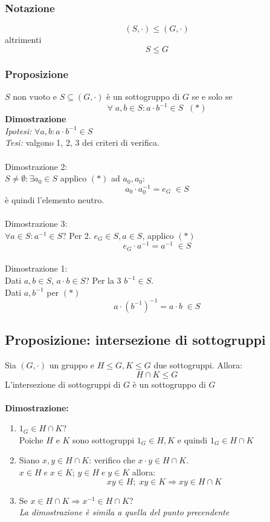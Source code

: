 \subsubsection{Notazione}
\[(S,\cdot)\leq (G,\cdot )\]
altrimenti
\[S\leq G\]

\subsubsection{Proposizione}
\(S\) non vuoto e \(S\subseteq (G,\cdot)\) è un sottogruppo di \(G\) se e solo se
\[\forall\;a,b \in S: a\cdot b^{-1}\in S\;\;(*)\]
\textbf{Dimostrazione}
\\\textit{Ipotesi:} \(\forall a,b: a\cdot b^{-1}\in S\)
\\\textit{Tesi:} valgono 1, 2, 3 dei criteri di verifica.
\\\\
Dimostrazione 2:
\\
\(S\neq\emptyset :\exists a_0\in S\) applico \((*)\) ad \(a_0, a_0\):
\[a_0\cdot a_0^{-1}=e_G\;\in S\]
è quindi l'elemento neutro.
\\\\
Dimostrazione 3:
\\
\(\forall a\in S:a^{-1}\in S\)?
Per 2. \(e_G\in S, a\in S\), applico \((*)\)
\[e_G\cdot a^{-1}=a^{-1}\;\in S\]
\\
Dimostrazione 1:
\\
Dati \(a, b\in S\), \(a\cdot b\in S\)? Per la 3 \(b^{-1}\in S\).
\\
Dati \(a,b^{-1}\) per \((*)\)
\[a\cdot (b^{-1})^{-1}=a\cdot b\;\in S\]

\subsection{Proposizione: intersezione di sottogruppi}
Sia \((G,\cdot)\) un gruppo e \(H\leq G, K\leq G\) due sottogruppi. Allora:
\[H\cap K\leq G\]
L'intersezione di sottogruppi di \(G\) è un sottogruppo di \(G\)
\\
\\\textbf{Dimostrazione:}
\\
\begin{enumerate}
	\item \(1_G\in H\cap K\)?
	\\Poiche \(H\) e \(K\) sono sottogruppi \(1_G\in H,K\) e quindi \(1_G\in H\cap K\)

	\item Siano \(x, y\in H\cap K\): verifico che \(x\cdot y\in H\cap K\).
	\\\(x\in H\;e\;x\in K\); \(y\in H\;e\;y\in K\) allora:
	\[xy\in H;\;xy\in K\Rightarrow xy\in H\cap K\]

	\item Se \(x\in H\cap K\Rightarrow x^{-1}\in H\cap K\)?
	\\\textit{La dimostrazione è simila a quella del punto precendente}

\end{enumerate}

